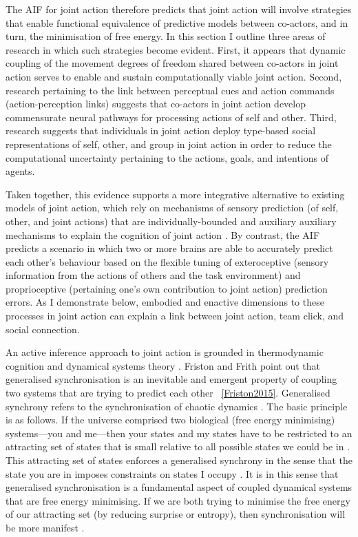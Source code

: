 \begin{CJK}{UTF8}{gbsn}
The AIF for joint action therefore predicts that joint action will involve strategies that enable functional equivalence of predictive models between co-actors, and in turn, the minimisation of free energy.  In this section I outline three areas of research in which such strategies become evident.  First, it appears that dynamic coupling of the movement degrees of freedom shared between co-actors in joint action serves to enable and sustain computationally viable joint action.  Second, research pertaining to the link between perceptual cues and action commands (action-perception links) suggests that co-actors in joint action develop commensurate neural pathways for processing actions of self and other.  Third, research suggests that individuals in joint action deploy type-based social representations of self, other, and group in joint action in order to reduce the computational uncertainty pertaining to the actions, goals, and intentions of agents.

Taken together, this evidence supports a more integrative alternative to existing models of joint action, which rely on mechanisms of sensory prediction (of self, other, and joint actions) that are individually-bounded and auxiliary auxiliary mechanisms to explain the cognition of joint action \citep[][; for an AFM model of coordination in joint action, see Appendix ~\ref{app2:AFMapproachJA}]{Pesquita2017}.  By contrast, the AIF predicts a scenario in which two or more brains are able to accurately predict each other's behaviour based on the flexible tuning of exteroceptive (sensory information from the actions of others and the task environment) and proprioceptive (pertaining one's own contribution to joint action) prediction errors.  As I demonstrate below, embodied and enactive dimensions to these processes in joint action can explain a link between joint action, team click, and social connection.



An active inference approach to joint action is grounded in thermodynamic cognition and dynamical systems theory \citep{Friston2013}.  Friston and Frith point out that generalised synchronisation is an inevitable and emergent property of coupling two systems that are trying to predict each other ~\ref{Friston2015}.  Generalised synchrony refers to the synchronisation of chaotic dynamics \citep{Barreto2003}.  The basic principle is as follows.  If the universe comprised two biological (free energy minimising) systems---you and me---then your states and my states have to be restricted to an attracting set of states that is small relative to all possible states we could be in \citep{Friston2015}.  This attracting set of states enforces a generalised synchrony in the sense that the state you are in imposes constraints on states I occupy \citep{Richardson2015}.  It is in this sense that generalised synchronisation is a fundamental aspect of coupled dynamical systems that are free energy minimising.  If we are both trying to minimise the free energy of our attracting set (by reducing surprise or entropy), then synchronisation will be more manifest \citep{Friston2015a}.


\end{CJK}
